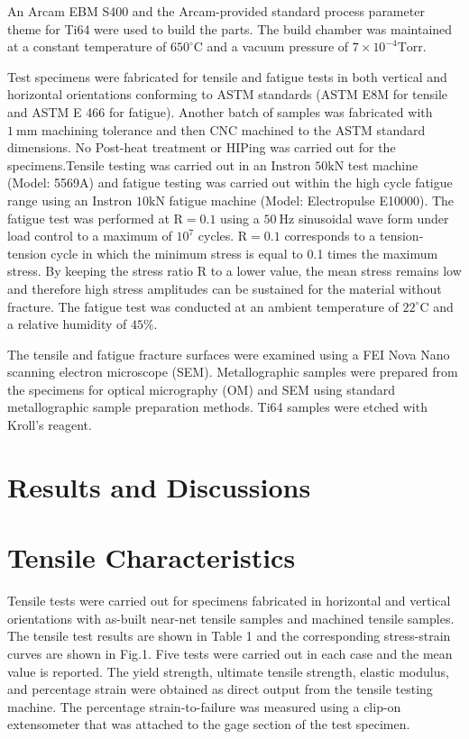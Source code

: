 \documentclass[10pt]{article}
\begin{document}
An Arcam EBM S400 and the Arcam-provided standard process parameter theme for Ti64 were used to build the parts. The build chamber was maintained at a constant temperature of $650^{\circ} \mathrm{C}$ and a vacuum pressure of $7 \times 10^{-4} \mathrm{Torr}$.

Test specimens were fabricated for tensile and fatigue tests in both vertical and horizontal orientations conforming to ASTM standards (ASTM E8M for tensile and ASTM E 466 for fatigue). Another batch of samples was fabricated with $1 \mathrm{~mm}$ machining tolerance and then CNC machined to the ASTM standard dimensions. No Post-heat treatment or HIPing was carried out for the specimens.Tensile testing was carried out in an Instron $50 \mathrm{kN}$ test machine (Model: 5569A) and fatigue testing was carried out within the high cycle fatigue range using an Instron $10 \mathrm{kN}$ fatigue machine (Model: Electropulse E10000). The fatigue test was performed at $\mathrm{R}=0.1$ using a $50 \mathrm{~Hz}$ sinusoidal wave form under load control to a maximum of $10^{7}$ cycles. $\mathrm{R}=0.1$ corresponds to a tension-tension cycle in which the minimum stress is equal to 0.1 times the maximum stress. By keeping the stress ratio $\mathrm{R}$ to a lower value, the mean stress remains low and therefore high stress amplitudes can be sustained for the material without fracture. The fatigue test was conducted at an ambient temperature of $22^{\circ} \mathrm{C}$ and a relative humidity of $45 \%$.

The tensile and fatigue fracture surfaces were examined using a FEI Nova Nano scanning electron microscope (SEM). Metallographic samples were prepared from the specimens for optical micrography (OM) and SEM using standard metallographic sample preparation methods. Ti64 samples were etched with Kroll's reagent.

\section*{Results and Discussions}
\section*{Tensile Characteristics}
Tensile tests were carried out for specimens fabricated in horizontal and vertical orientations with as-built near-net tensile samples and machined tensile samples. The tensile test results are shown in Table 1 and the corresponding stress-strain curves are shown in Fig.1. Five tests were carried out in each case and the mean value is reported. The yield strength, ultimate tensile strength, elastic modulus, and percentage strain were obtained as direct output from the tensile testing machine. The percentage strain-to-failure was measured using a clip-on extensometer that was attached to the gage section of the test specimen.
\end{document}
